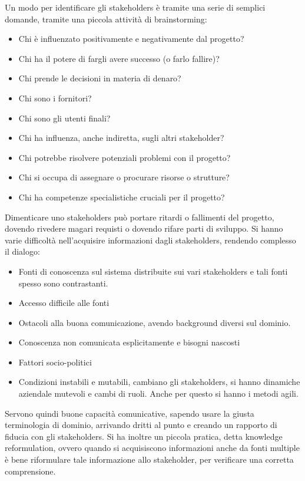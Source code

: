Un modo per identificare gli stakeholders è tramite una serie di semplici domande, tramite una piccola attività di brainstorming:
\begin{itemize}
    \item Chi è influenzato positivamente e negativamente dal progetto?
    \item Chi ha il potere di fargli avere successo (o farlo fallire)?
    \item Chi prende le decisioni in materia di denaro?
    \item Chi sono i fornitori?
    \item Chi sono gli utenti finali?
    \item Chi ha influenza, anche indiretta, sugli altri stakeholder?
    \item Chi potrebbe risolvere potenziali problemi con il progetto?
    \item Chi si occupa di assegnare o procurare risorse o strutture?
    \item Chi ha competenze specialistiche cruciali per il progetto?
\end{itemize}
Dimenticare uno stakeholders può portare ritardi o fallimenti del progetto, dovendo rivedere magari requisti o dovendo rifare parti di sviluppo. Si hanno varie difficoltà nell'acquisire informazioni dagli stakeholders, rendendo complesso il dialogo:
\begin{itemize}
    \item Fonti di conoscenza sul sistema distribuite sui vari stakeholders e tali fonti spesso sono contrastanti.
    \item Accesso difficile alle fonti
    \item Ostacoli alla buona comunicazione, avendo background diversi sul dominio.
    \item Conoscenza non comunicata esplicitamente e bisogni nascosti
    \item Fattori socio-politici
    \item Condizioni instabili e mutabili, cambiano gli stakeholders, si hanno dinamiche aziendale mutevoli e cambi di ruoli. Anche per questo si hanno i metodi agili.
\end{itemize}

Servono quindi buone capacità comunicative, sapendo usare la giusta terminologia di dominio, arrivando dritti al punto e creando un rapporto di fiducia con gli stakeholders. Si ha inoltre un piccola pratica, detta knowledge reformulation, ovvero quando si acquisiscono informazioni anche da fonti multiple è bene riformulare tale informazione allo stakeholder, per verificare una corretta comprensione.

